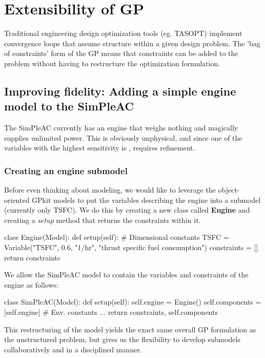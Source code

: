 \chapter{Extensibility of GP}

Traditional engineering design optimization tools (eg. TASOPT) implement
convergence loops that assume structure within a given design problem.
The 'bag of constraints' form of the GP means that constraints can be
added to the problem without
having to restructure the optimization formulation.

\section{Improving fidelity: Adding a simple engine model to the SimPleAC}
\label{s:engine}

The SimPleAC currently has an engine that weighs nothing and magically supplies
unlimited power. This is obviously unphysical, and since one of the variables
with the highest sensitivity is \TSFC, requires refinement.

\subsection{Creating an engine submodel}

Before even thinking about modeling, we would like to leverage the object-oriented 
GPkit models to put the variables describing the engine into a submodel (currently only 
TSFC). We do this by creating a new class called \textbf{Engine} and creating a \textit{setup}
method that returns the constraints within it.

\begin{python}
class Engine(Model):
    def setup(self):
        # Dimensional constants
        TSFC      = Variable("TSFC", 0.6, "1/hr", "thrust specific fuel consumption")
        constraints = []
        return constraints    
\end{python}

We allow the SimPleAC model to contain the variables and constraints of the engine
as follows:

\begin{python}
class SimPleAC(Model):
    def setup(self):
        self.engine = Engine()
        self.components = [self.engine]
        # Env. constants
        ...
        return constraints, self.components
\end{python}

This restructuring of the model yields the exact same overall GP formulation 
as the unstructured problem, but gives us the flexibility to develop submodels
collaboratively and in a disciplined manner.

